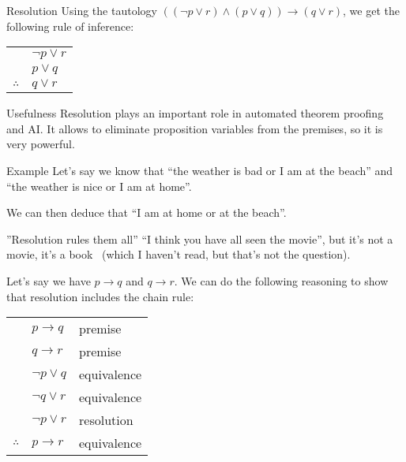 \documentclass{article}
\begin{document}
\begin{parag}{Resolution}
    Using the tautology $\left(\left(\lnot p \lor r\right) \land \left(p \lor q\right)\right) \to \left(q \lor r\right)$, we get the following rule of inference:
    \begin{center}
    \begin{tabular}{rl}
        & $\lnot p \lor r$ \\
        & $p \lor q$ \\
        \hline
        $\therefore$ & $q \lor r$
    \end{tabular}
    \end{center}

    \begin{subparag}{Usefulness}
        Resolution plays an important role in automated theorem proofing and AI. It allows to eliminate proposition variables from the premises, so it is very powerful.
    \end{subparag}

    \begin{subparag}{Example}
        Let's say we know that ``the weather is bad or I am at the beach'' and ``the weather is nice or I am at home''.

        We can then deduce that ``I am at home or at the beach''.
    \end{subparag}

    \begin{subparag}{''Resolution rules them all''}
        ``I think you have all seen the movie'', but it's not a movie, it's a book \frownie\ (which I haven't read, but that's not the question).

        Let's say we have $p \to q$ and $q \to r$. We can do the following reasoning to show that resolution includes the chain rule:
        \begin{center}
        \begin{tabular}{rll}
            & $p \to q$ & premise \\
            & $q \to r$ & premise \\
            & $\lnot p \lor q$ & equivalence \\
            & $\lnot q \lor r$ & equivalence \\
            & $\lnot p \lor r$ & resolution  \\
            \hline
            $\therefore$ & $p \to r$ & equivalence
        \end{tabular}
        \end{center}


\end{subparag}
\end{parag}
\end{document}
